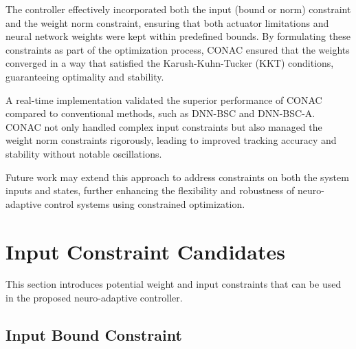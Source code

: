 \documentclass[lettersize,journal]{IEEEtran}
\begin{document}
The controller effectively incorporated both the input (bound or norm) constraint and the weight norm constraint, ensuring that both actuator limitations and neural network weights were kept within predefined bounds. 
By formulating these constraints as part of the optimization process, CONAC ensured that the weights converged in a way that satisfied the Karush-Kuhn-Tucker (KKT) conditions, guaranteeing optimality and stability.

A real-time implementation validated the superior performance of CONAC compared to conventional methods, such as DNN-BSC and DNN-BSC-A. CONAC not only handled complex input constraints but also managed the weight norm constraints rigorously, leading to improved tracking accuracy and stability without notable oscillations.

Future work may extend this approach to address constraints on both the system inputs and states, further enhancing the flexibility and robustness of neuro-adaptive control systems using constrained optimization.

\appendix

\section{Input Constraint Candidates}\label{sec:appen:cstr} 

This section introduces potential weight and input constraints that can be used in the proposed neuro-adaptive controller. 

\subsection{Input Bound Constraint}\label{sec:appen:cstr:input:bound}
\end{document}
